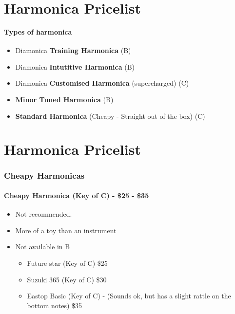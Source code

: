 \newpage

\part*{Harmonica Pricelist}
    \subsection*{Types of harmonica}
        \begin{itemize}
            \item Diamonica \textbf{Training Harmonica} (B)
            \item Diamonica \textbf{Intutitive Harmonica} (B)
            \item Diamonica \textbf{Customised Harmonica} (supercharged) (C)
            \item \textbf{Minor Tuned Harmonica} (B)
            \item \textbf{Standard Harmonica} (Cheapy - Straight out of the box) (C)
        \end{itemize}
        
\part*{Harmonica Pricelist}
    \section*{Cheapy Harmonicas}
     \subsection*{Cheapy Harmonica (Key of C) - \$25 - \$35}
            \begin{itemize}
                \item Not recommended. 
                \item More of a toy than an instrument
                \item Not available in B
                \begin{itemize}
                    \item Future star (Key of C)	\$25
                    
                    \item Suzuki 365 (Key of C) \$30
                    
                    \item Eastop Basic (Key of C) - (Sounds ok, but has a slight rattle on the bottom notes) \$35
                    
                \end{itemize}
            \end{itemize} 
